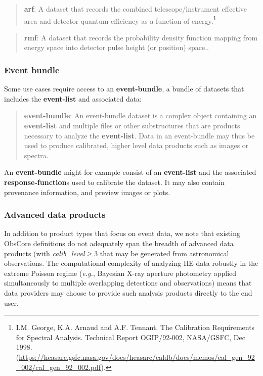 \documentclass[11pt,a4paper]{ivoa}
\begin{document}
\begin{quote}
{\bf arf}: A dataset that records the combined telescope/instrument effective area and detector quantum efficiency as a function of energy.\footnote{\label{fn:ogip92002}I.M. George, K.A. Arnaud and A.F. Tennant. The Calibration Requirements for Spectral Analysis. Technical Report OGIP/92-002, NASA/GSFC, Dec 1998. (\url{https://heasarc.gsfc.nasa.gov/docs/heasarc/caldb/docs/memos/cal_gen_92_002/cal_gen_92_002.pdf}).}
\end{quote}

\begin{quote}
{\bf rmf}: A dataset that records the probability density function mapping from energy space into detector pulse height (or position) space..
\end{quote}

\subsubsection{Event bundle}

Some use cases  require access to an {\bf event-bundle}, a bundle of datasets that includes the {\bf event-list} and associated  data:

\begin{quote}
{\bf event-bundle}: An event-bundle dataset is a complex object containing an {\bf event-list} and multiple files or other substructures that are products necessary to analyze the {\bf event-list}. Data in an event-bundle may thus be used to produce calibrated, higher level data products such as images or spectra.
\end{quote}

An {\bf event-bundle} might for example consist of an {\bf event-list} and the associated {\bf response-function}s used to calibrate the dataset.
It may also contain provenance information, and preview images or plots.

\subsubsection{Advanced data products}

In addition to product types that focus on event data, we note that existing ObsCore definitions do not adequately span the breadth of advanced data products (with {\em calib\_level\/}${}\ge 3$ that may be generated from astronomical observations. The computational complexity of analyzing \gls{HE} data robustly in the extreme Poisson regime ({\em e.g.\/}, Bayesian X-ray aperture photometry applied simultaneously to multiple overlapping detections and observations) means that data providers may choose to provide such analysis products directly to the end user.
\end{document}
